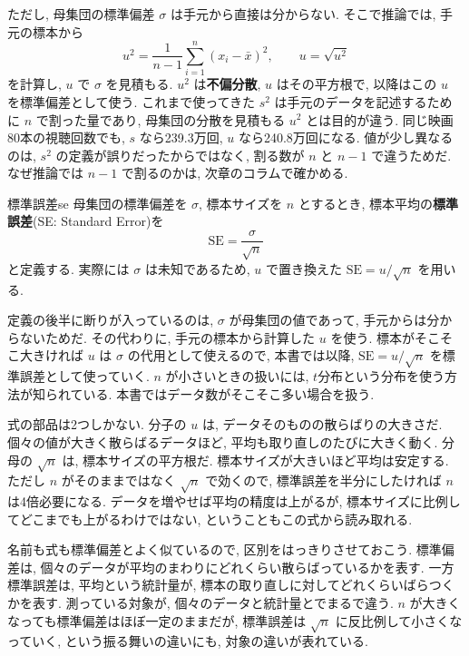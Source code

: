     ただし, 母集団の標準偏差 $\sigma$ は手元から直接は分からない.
    そこで推論では, 手元の標本から
    \[
      u^2 = \frac{1}{n-1}\sum_{i=1}^{n}(x_i-\bar{x})^2, \qquad u = \sqrt{u^2}
    \]
    を計算し, $u$ で $\sigma$ を見積もる.
    $u^2$ は\textbf{不偏分散}, $u$ はその平方根で, 以降はこの $u$ を標準偏差として使う.
    これまで使ってきた $s^2$ は手元のデータを記述するために $n$ で割った量であり, 母集団の分散を見積もる $u^2$ とは目的が違う.
    同じ映画80本の視聴回数でも, $s$ なら239.3万回, $u$ なら240.8万回になる.
    値が少し異なるのは, $s^2$ の定義が誤りだったからではなく, 割る数が $n$ と $n-1$ で違うためだ.
    なぜ推論では $n-1$ で割るのかは, 次章のコラムで確かめる.

\begin{defi}{標準誤差}{se}
  母集団の標準偏差を $\sigma$, 標本サイズを $n$ とするとき, 標本平均の\textbf{標準誤差}(SE: Standard Error)を
  \[
    \mathrm{SE} = \frac{\sigma}{\sqrt{n}}
  \]
  と定義する.
  実際には $\sigma$ は未知であるため, $u$ で置き換えた $\mathrm{SE} = u / \sqrt{n}$ を用いる.
\end{defi}

    定義の後半に断りが入っているのは, $\sigma$ が母集団の値であって, 手元からは分からないためだ.
    その代わりに, 手元の標本から計算した $u$ を使う.
    標本がそこそこ大きければ $u$ は $\sigma$ の代用として使えるので, 本書では以降, $\mathrm{SE} = u/\sqrt{n}$ を標準誤差として使っていく.
    $n$ が小さいときの扱いには, $t$分布という分布を使う方法が知られている.
    本書ではデータ数がそこそこ多い場合を扱う.

    式の部品は2つしかない.
    分子の $u$ は, データそのものの散らばりの大きさだ.
    個々の値が大きく散らばるデータほど, 平均も取り直しのたびに大きく動く.
    分母の $\sqrt{n}$ は, 標本サイズの平方根だ.
    標本サイズが大きいほど平均は安定する.
    ただし $n$ がそのままではなく $\sqrt{n}$ で効くので, 標準誤差を半分にしたければ $n$ は4倍必要になる.
    データを増やせば平均の精度は上がるが, 標本サイズに比例してどこまでも上がるわけではない, ということもこの式から読み取れる.

    名前も式も標準偏差とよく似ているので, 区別をはっきりさせておこう.
    標準偏差は, 個々のデータが平均のまわりにどれくらい散らばっているかを表す.
    一方標準誤差は, 平均という統計量が, 標本の取り直しに対してどれくらいばらつくかを表す.
    測っている対象が, 個々のデータと統計量とでまるで違う.
    $n$ が大きくなっても標準偏差はほぼ一定のままだが, 標準誤差は $\sqrt{n}$ に反比例して小さくなっていく, という振る舞いの違いにも, 対象の違いが表れている.

